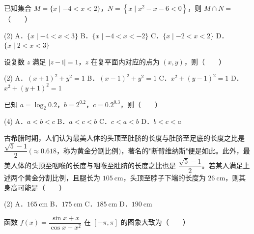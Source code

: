\begin{question}
已知集合 $M=\{x\mid-4<x<2\}$，$N=\left\{x\mid x^{2}-x-6<0\right\}$，则 $M\cap N=$\mbox{（　　）}

\begin{gkopts}(2)
\task A．$\{x\mid-4<x<3\}$
\task B．$\{x\mid-4<x<-2\}$
\task C．$\{x\mid-2<x<2\}$
\task D．$\{x\mid2<x<3\}$
\end{gkopts}

\end{question}
\begin{question}
设复数 $z$ 满足 $|z-\mathrm i|=1$，$z$ 在复平面内对应的点为 $(x,y)$，则\mbox{（　　）}

\begin{gkopts}(2)
\task A．$(x+1)^{2}+y^{2}=1$
\task B．$(x-1)^{2}+y^{2}=1$
\task C．$x^{2}+(y-1)^{2}=1$
\task D．$x^{2}+(y+1)^{2}=1$
\end{gkopts}

\end{question}
\begin{question}
已知 $a=\log_2 0.2$，$b=2^{0.2}$，$c=0.2^{0.3}$，则\mbox{（　　）}

\begin{gkopts}(4)
\task A．$a<b<c$
\task B．$a<c<b$
\task C．$c<a<b$
\task D．$b<c<a$
\end{gkopts}

\end{question}
\begin{question}
古希腊时期，人们认为最美人体的头顶至肚脐的长度与肚脐至足底的长度之比是 $\dfrac{\sqrt5-1}2\ (\approx0.618$，称为黄金分割比例$)$，著名的"断臂维纳斯"便是如此。此外，最美人体的头顶至咽喉的长度与咽喉至肚脐的长度之比也是 $\dfrac{\sqrt5-1}2$。若某人满足上述两个黄金分割比例，且腿长为 $105\ \mathrm{cm}$，头顶至脖子下端的长度为 $26\ \mathrm{cm}$，则其身高可能是\mbox{（　　）}

\begin{gkopts}(2)
\task A．$165\ \mathrm{cm}$
\task B．$175\ \mathrm{cm}$
\task C．$185\ \mathrm{cm}$
\task D．$190\ \mathrm{cm}$
\end{gkopts}

\Needspace{0.4\textheight}
\end{question}
\begin{question}
函数 $f(x)=\dfrac{\sin x+x}{\cos x+x^{2}}$ 在 $[-\pi,\pi]$ 的图象大致为\mbox{（　　）}
\nopagebreak[4]
\begin{center}\end{center}
\nopagebreak[4]
\Needspace{0.4\textheight}
\end{question}
